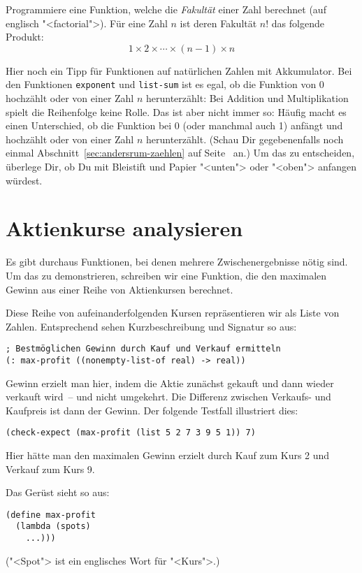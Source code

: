 \begin{aufgabeinline}
  Programmiere eine Funktion, welche die
  \textit{Fakultät} einer Zahl berechnet (auf englisch
  "<factorial">). Für eine Zahl $n$ ist deren Fakultät $n!$ das
  folgende Produkt: \[1\times 2\times \cdots \times (n-1)\times n\]
\end{aufgabeinline}

Hier noch ein Tipp für Funktionen auf natürlichen Zahlen mit
Akkumulator.  Bei den Funktionen \lstinline{exponent} und
\lstinline{list-sum} ist es egal, ob die Funktion von 0 hochzählt oder
von einer Zahl $n$ herunterzählt: Bei Addition und Multiplikation
spielt die Reihenfolge keine Rolle.  Das ist aber nicht immer so:
Häufig macht es einen Unterschied, ob die Funktion bei 0 (oder
manchmal auch 1) anfängt und hochzählt oder von einer Zahl $n$
herunterzählt.  (Schau Dir gegebenenfalls noch einmal
Abschnitt~\ref{sec:andersrum-zaehlen} auf
Seite~\pageref{sec:andersrum-zaehlen} an.)  Um das zu entscheiden,
überlege Dir, ob Du mit Bleistift und Papier "<unten"> oder "<oben">
anfangen würdest.

\section{Aktienkurse analysieren}

Es gibt durchaus Funktionen, bei denen mehrere Zwischenergebnisse
nötig sind.  Um das zu demonstrieren, schreiben wir eine Funktion, die
den maximalen Gewinn aus einer Reihe von Aktienkursen berechnet.

Diese Reihe von aufeinanderfolgenden Kursen repräsentieren wir als
Liste von Zahlen.  Entsprechend sehen Kurzbeschreibung und Signatur so
aus:
%
\begin{lstlisting}
; Bestmöglichen Gewinn durch Kauf und Verkauf ermitteln
(: max-profit ((nonempty-list-of real) -> real))
\end{lstlisting}
%
Gewinn erzielt man hier, indem die Aktie zunächst gekauft und dann
wieder verkauft wird~-- und nicht umgekehrt.  Die Differenz zwischen
Verkaufs- und Kaufpreis ist dann der Gewinn.  Der folgende Testfall
illustriert dies:
%
\begin{lstlisting}
(check-expect (max-profit (list 5 2 7 3 9 5 1)) 7)
\end{lstlisting}
%
Hier hätte man den maximalen Gewinn erzielt durch Kauf zum Kurs 2 und
Verkauf zum Kurs 9.

Das Gerüst sieht so aus:
%
\begin{lstlisting}
(define max-profit
  (lambda (spots)
    ...)))
\end{lstlisting}
%
("<Spot"> ist ein englisches Wort für "<Kurs">.)

